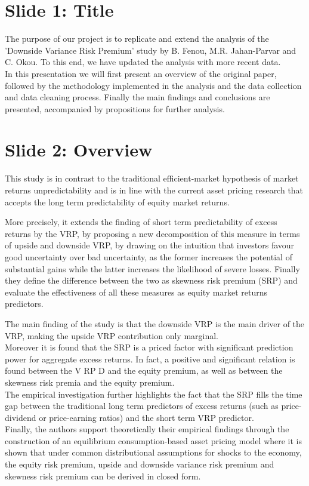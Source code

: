 \documentclass[12pt, letterpaper]{article}
\begin{document}
\section{Slide 1: Title}
The purpose of our project is to replicate and extend the analysis of the ’Downside Variance Risk Premium’ study by B. Fenou, M.R. Jahan-Parvar and C. Okou.  To this end, we have updated the analysis with more recent data.  \\
In this presentation we will first present an overview of the original paper, followed by the methodology implemented in the analysis and the data collection and data cleaning process.  Finally the main findings and conclusions are presented, accompanied by propositions for further analysis. 

\section{Slide 2: Overview}
This study is in contrast to the traditional efficient-market hypothesis of market returns unpredictability and is in line with the current asset pricing research that accepts the long term predictability of equity market returns. 

\vspace{3mm}
\noindent
More precisely, it extends the finding of short term predictability of excess returns by the VRP, by proposing a new decomposition of this measure  in terms of upside and downside VRP, by drawing on the intuition that investors favour good uncertainty over bad uncertainty, as the former increases the potential of substantial gains while the latter increases the likelihood of severe losses.
Finally they define the difference between the two as skewness risk premium (SRP) and evaluate the effectiveness of all these measures as equity market returns predictors. 

\vspace{3mm}
\noindent
The main finding of the study is that the downside VRP is the main driver of the VRP, making the upside VRP contribution only marginal.\\
Moreover it is found that the SRP is a priced factor with significant prediction power for aggregate excess returns. In fact, a positive and significant relation is found between the V RP D and the equity premium, as well as between the skewness risk premia and the equity premium.\\
The empirical investigation further highlights the fact that the SRP fills the time gap between the traditional long term predictors of excess returns (such as price-dividend or price-earning ratios) and the short term VRP predictor. \\
Finally, the authors support theoretically their empirical findings through the construction of an equilibrium consumption-based asset pricing model where it is shown that under common distributional assumptions for shocks to the economy, the equity risk premium, upside and downside variance risk premium and skewness risk premium can be derived in closed form.
\end{document}
